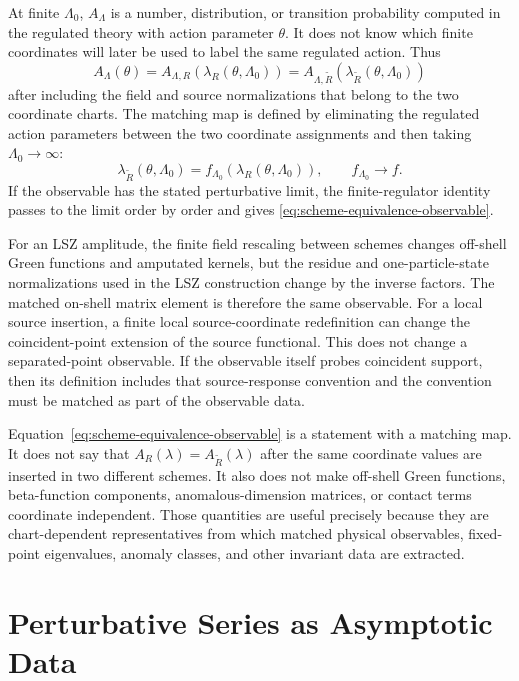 At finite \(\Lambda_0\), \(A_\Lambda\) is a number, distribution, or transition
probability computed in the regulated theory with action parameter \(\theta\).  It
does not know which finite coordinates will later be used to label the same
regulated action.  Thus
\[
  A_\Lambda(\theta)
  =
  A_{\Lambda,R}(\lambda_R(\theta,\Lambda_0))
  =
  A_{\Lambda,\widetilde R}
    (\lambda_{\widetilde R}(\theta,\Lambda_0))
\]
after including the field and source normalizations that belong to the two
coordinate charts.  The matching map is defined by eliminating the regulated
action parameters between the two coordinate assignments and then taking
\(\Lambda_0\to\infty\):
\[
  \lambda_{\widetilde R}(\theta,\Lambda_0)
  =
  f_{\Lambda_0}(\lambda_R(\theta,\Lambda_0)),
  \qquad
  f_{\Lambda_0}\to f .
\]
If the observable has the stated perturbative limit, the finite-regulator
identity passes to the limit order by order and gives
\eqref{eq:scheme-equivalence-observable}.

For an LSZ amplitude, the finite field rescaling between schemes changes
off-shell Green functions and amputated kernels, but the residue and
one-particle-state normalizations used in the LSZ construction change by the
inverse factors.  The matched on-shell matrix element is therefore the same
observable.  For a local source insertion, a finite local source-coordinate
redefinition can change the coincident-point extension of the source
functional.  This does not change a separated-point observable.  If the
observable itself probes coincident support, then its definition includes that
source-response convention and the convention must be matched as part of the
observable data.

\begin{remark}
Equation~\eqref{eq:scheme-equivalence-observable} is a statement with a
matching map.  It does not say that
\(A_R(\lambda)=A_{\widetilde R}(\lambda)\) after the same coordinate values are
inserted in two different schemes.  It also does not make off-shell Green
functions, beta-function components, anomalous-dimension matrices, or contact
terms coordinate independent.  Those quantities are useful precisely because
they are chart-dependent representatives from which matched physical
observables, fixed-point eigenvalues, anomaly classes, and other invariant data
are extracted.
\end{remark}

\section{Perturbative Series as Asymptotic Data}

